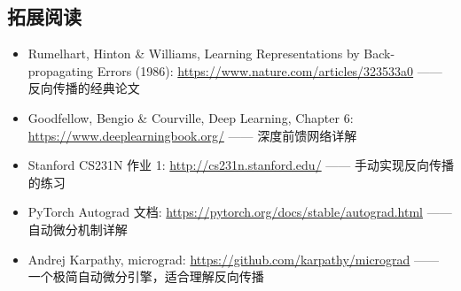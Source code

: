 \subsection{拓展阅读}

\begin{itemize}
    \item Rumelhart, Hinton \& Williams, Learning Representations by Back-propagating Errors (1986): \url{https://www.nature.com/articles/323533a0} —— 反向传播的经典论文
    \item Goodfellow, Bengio \& Courville, Deep Learning, Chapter 6: \url{https://www.deeplearningbook.org/} —— 深度前馈网络详解
    \item Stanford CS231N 作业 1: \url{http://cs231n.stanford.edu/} —— 手动实现反向传播的练习
    \item PyTorch Autograd 文档: \url{https://pytorch.org/docs/stable/autograd.html} —— 自动微分机制详解
    \item Andrej Karpathy, micrograd: \url{https://github.com/karpathy/micrograd} —— 一个极简自动微分引擎，适合理解反向传播
\end{itemize}


